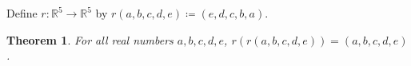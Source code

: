 \documentclass{article}
\newtheorem{theorem}{Theorem}
\begin{document}
Define $r:\mathbb{R}^5\to\mathbb{R}^5$ by $r(a,b,c,d,e)\coloneqq(e,d,c,b,a)$.
\begin{theorem}\label{thm:heldout}
For all real numbers $a,b,c,d,e$, $r(r(a,b,c,d,e))=(a,b,c,d,e)$.
\end{theorem}
\end{document}
